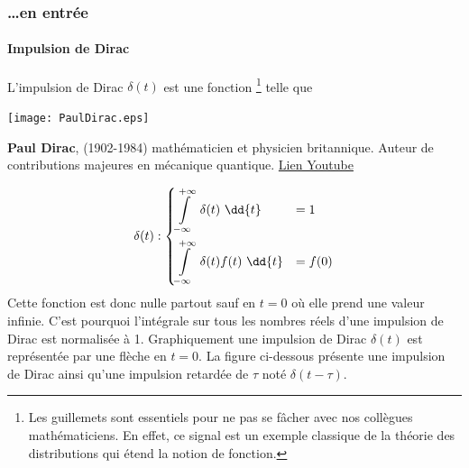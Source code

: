 \subsubsection{\ldots en entrée}
\paragraph{Impulsion de Dirac}
L'impulsion de Dirac
$\delta(t)$ est une \og fonction\fg 
\footnote{Les guillemets sont essentiels pour ne pas se fâcher avec 
nos collègues mathématiciens. En effet, ce signal est un exemple classique de 
la théorie des distributions qui étend la notion de fonction.} telle que
\begin{marginfigure}[0.5em]
    \centering
    \texttt{[image: PaulDirac.eps]} 
    \caption*{\textbf{Paul Dirac}, (1902-1984) 
              mathématicien et physicien britannique. Auteur de 
              contributions majeures en mécanique quantique. 
              \href{https://www.youtube.com/watch?v=Et8-gg6XNDY}{Lien Youtube}
              } 
\end{marginfigure}
\begin{align*}
    \delta(t) : 
    \begin{dcases}
    	\int\limits_{-\infty}^{+\infty}	 \delta(t)\,\,\dd{t}&=1   \\
        \int\limits_{-\infty}^{+\infty}  \delta(t)f(t)\,\,\dd{t}&=f(0)	
    \end{dcases}
\end{align*}
Cette fonction est donc nulle partout sauf en $t=0$ où elle prend 
une valeur infinie. C'est pourquoi l'intégrale sur tous les nombres réels 
d'une impulsion de Dirac est normalisée à 1.
Graphiquement une impulsion de Dirac $\delta(t)$ est 
représentée par une flèche en $t=0$. La figure ci-dessous présente 
une impulsion de Dirac ainsi qu'une 
impulsion retardée de $\tau$ noté $\delta(t-\tau)$.
